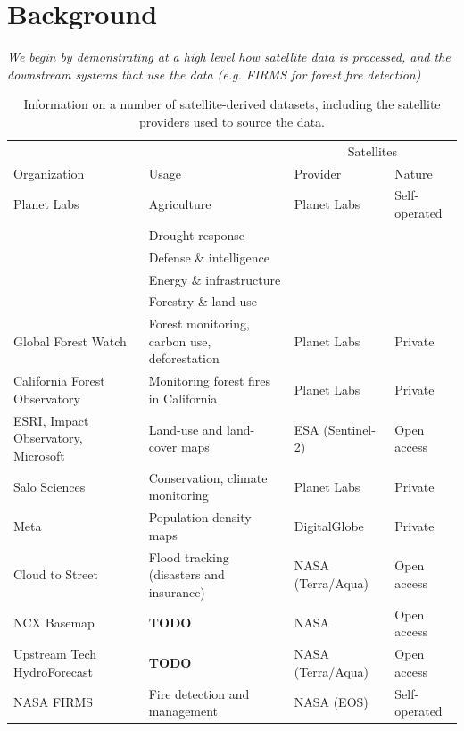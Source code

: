 \section{Background}\label{sec:background}

\textit{We begin by demonstrating at a high level how satellite data is processed, and the downstream systems that use the data (e.g. FIRMS for forest fire detection)}

\begin{table}
    \begin{tabular}{llll}
        \toprule
                     &       & \multicolumn{2}{c}{Satellites} \\
        \cmidrule(lr){3-4}
        Organization & Usage & Provider & Nature \\
        \midrule
        Planet Labs & Agriculture & Planet Labs & Self-operated \\
                    & Drought response & & \\
                    & Defense \& intelligence & & \\
                    & Energy \& infrastructure & & \\
                    & Forestry \& land use & & \\
        Global Forest Watch & Forest monitoring, carbon use, deforestation & Planet Labs & Private \\
        California Forest Observatory & Monitoring forest fires in California & Planet Labs & Private \\
        ESRI, Impact Observatory, Microsoft & Land-use and land-cover maps & ESA (Sentinel-2) & Open access \\
        Salo Sciences & Conservation, climate monitoring & Planet Labs & Private \\
        Meta & Population density maps & DigitalGlobe & Private \\
        Cloud to Street & Flood tracking (disasters and insurance) & NASA (Terra/Aqua) & Open access \\
        NCX Basemap & \textbf{TODO} & NASA & Open access \\
        Upstream Tech HydroForecast & \textbf{TODO} & NASA (Terra/Aqua) & Open access \\
        NASA FIRMS & Fire detection and management & NASA (EOS) & Self-operated \\
        \bottomrule
    \end{tabular}
    \caption{Information on a number of satellite-derived datasets, including the satellite providers used to source the data.}
    \label{tab:satellite-derived-datasets}
\end{table}

